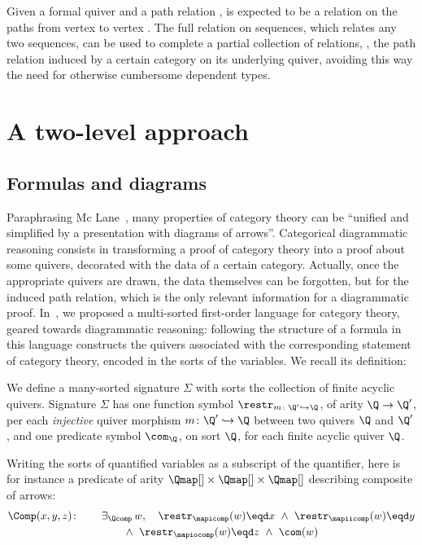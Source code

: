 \documentclass[a4paper,UKenglish,cleveref, autoref, thm-restate]{lipics-v2021}
\begin{document}
Given a formal quiver and a path relation ,  is expected to be a relation on the paths from vertex  to vertex . The full relation on sequences, which relates any two sequences, can be used to complete a partial collection of relations, \eg{}, the path relation induced by a certain category on its underlying quiver, avoiding this way the need for otherwise cumbersome dependent types.





\section{A two-level approach}\label{sec:dsl}

\subsection{Formulas and diagrams}\label{ssec:formdiag}

Paraphrasing Mc Lane~\cite{zbMATH01216133}, many properties of category theory can be \enquote{unified and simplified by a presentation with diagrams of arrows}. Categorical diagrammatic reasoning consists in transforming a proof of category theory into a proof about some quivers, decorated with the data of a certain category. Actually, once the appropriate quivers are drawn, the data themselves can be forgotten, but for the induced path relation, which is the only relevant information for a diagrammatic proof. In~\cite{DBLP:conf/csl/MahboubiP24}, we proposed a multi-sorted first-order language for category theory, geared towards diagrammatic reasoning: following the structure of a formula in this language constructs the quivers associated with the corresponding statement of category theory, encoded in the sorts of the variables. We recall its definition:
\begin{definition}\label{def:sig}
    We define a many-sorted signature $\Sigma$ with sorts the collection of finite acyclic quivers. Signature\/ $\Sigma$ has one function symbol $\restr_{m\colon \Q'\hookrightarrow \Q}$, of arity $\Q \to \Q'$, per each \emph{injective} quiver morphism $m\colon \Q' \hookrightarrow \Q$ between two quivers $\Q$ and $\Q'$, and one predicate symbol $\com_\Q$, on sort $\Q$, for each finite acyclic quiver $\Q$.
  \end{definition}

\begin{example}
Writing the sorts of quantified variables as a subscript of the quantifier, here is for instance a predicate of arity $\Qmap[] \times \Qmap[] \times \Qmap[]$ describing composite of arrows:
\begin{align*}
  \Comp(x,y,z)\colon\qquad& \exists_{\Qcomp}\, w,\quad \restr_{\mapicomp}(w) \eqd x \ \wedge \ \restr_{\mapiicomp}(w) \eqd y \\
  &\qquad \wedge \ \restr_{\mapiocomp}(w) \eqd z \ \wedge \ \com(w)
\end{align*}
\end{example}
\end{document}
